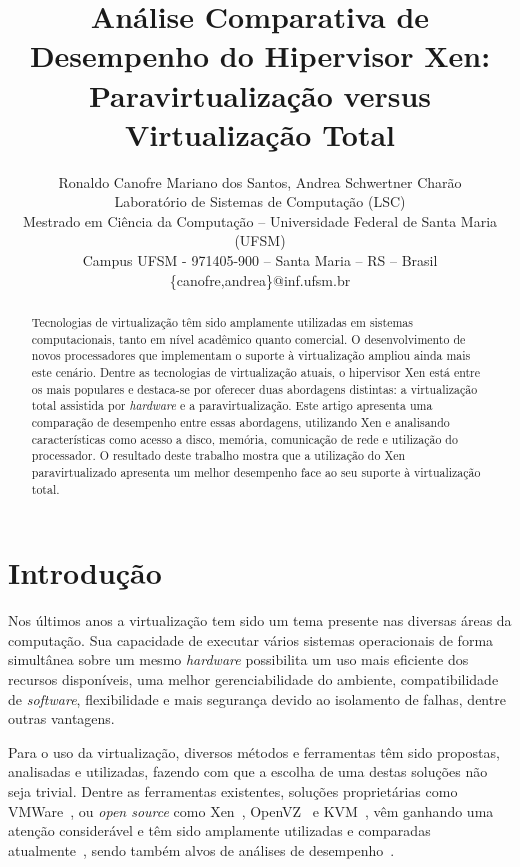\documentclass[times, 10pt,twocolumn]{article}
\def\sw{\textit{software}\xspace}
\def\hw{\textit{hardware}\xspace}
\def\hpv{hipervisor\xspace}
\begin{document}
\title{Análise Comparativa de Desempenho do Hipervisor Xen: Paravirtualização versus Virtualização Total}

\author{Ronaldo Canofre Mariano dos Santos, Andrea Schwertner Charão\\
    Laboratório de Sistemas de Computação (LSC)\\
    Mestrado em  Ciência da Computação --
    Universidade Federal de Santa Maria (UFSM)\\
	Campus UFSM - 971405-900 -- Santa Maria -- RS -- Brasil\\
    \{canofre,andrea\}@inf.ufsm.br}

\maketitle
\thispagestyle{empty}

\begin{abstract}
Tecnologias de virtualização têm sido amplamente utilizadas em
sistemas computacionais, tanto em nível acadêmico quanto comercial.
O desenvolvimento de novos processadores que implementam o suporte à virtualização
ampliou ainda mais este cenário. Dentre as tecnologias de virtualização atuais,
o \hpv Xen está entre os mais populares e destaca-se por oferecer duas
abordagens distintas: a virtualização total assistida por \hw e
a paravirtualização. Este artigo apresenta uma comparação de desempenho entre
essas abordagens, utilizando Xen e analisando características como acesso a
disco, memória, comunicação de rede e utilização do processador. O resultado 
deste trabalho mostra que a utilização do Xen paravirtualizado apresenta um 
melhor desempenho face ao seu suporte à virtualização total.
\end{abstract}


\section{Introdução}\label{s:introducao}
Nos últimos anos a virtualização tem sido um tema presente nas diversas áreas da
computação. Sua capacidade de executar vários sistemas operacionais de forma
simultânea sobre um mesmo \hw  possibilita um uso mais eficiente dos recursos
disponíveis, uma melhor gerenciabilidade do ambiente, compatibilidade de \sw,
flexibilidade e mais segurança devido ao isolamento de falhas, dentre outras 
vantagens.

Para o uso da virtualização, diversos métodos e ferramentas têm sido propostas,
analisadas e utilizadas, fazendo com que a escolha de uma destas soluções não seja
trivial. Dentre as ferramentas existentes, soluções proprietárias como 
VMWare~\cite{vmware}, ou \textit{open source} como Xen~\cite{xen}, OpenVZ~\cite{openvz}
e KVM~\cite{kvmwiki}, vêm ganhando uma atenção considerável e têm sido amplamente 
utilizadas e comparadas atualmente~\cite{xenopenvz,cappello}, 
sendo também alvos de análises de desempenho~\cite{urschei07}. 
\end{document}
